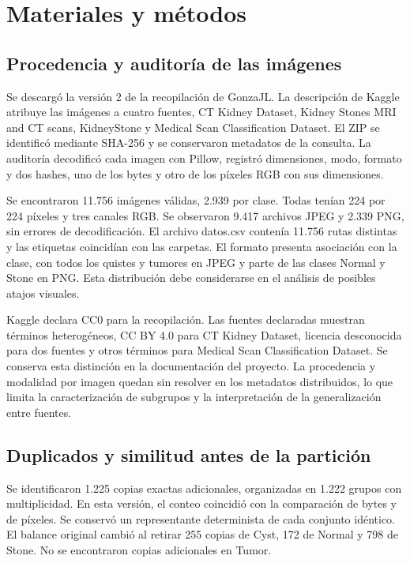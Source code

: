 \documentclass[conference]{IEEEtran}
\begin{document}
\section{Materiales y métodos}
\subsection{Procedencia y auditoría de las imágenes}
Se descargó la versión 2 de la recopilación de GonzaJL. La descripción de Kaggle atribuye las imágenes a cuatro fuentes, CT Kidney Dataset, Kidney Stones MRI and CT scans, KidneyStone y Medical Scan Classification Dataset. El ZIP se identificó mediante SHA-256 y se conservaron metadatos de la consulta. La auditoría decodificó cada imagen con Pillow, registró dimensiones, modo, formato y dos hashes, uno de los bytes y otro de los píxeles RGB con sus dimensiones.

Se encontraron 11.756 imágenes válidas, 2.939 por clase. Todas tenían 224 por 224 píxeles y tres canales RGB. Se observaron 9.417 archivos JPEG y 2.339 PNG, sin errores de decodificación. El archivo datos.csv contenía 11.756 rutas distintas y las etiquetas coincidían con las carpetas. El formato presenta asociación con la clase, con todos los quistes y tumores en JPEG y parte de las clases Normal y Stone en PNG. Esta distribución debe considerarse en el análisis de posibles atajos visuales.

Kaggle declara CC0 para la recopilación. Las fuentes declaradas muestran términos heterogéneos, CC BY 4.0 para CT Kidney Dataset, licencia desconocida para dos fuentes y otros términos para Medical Scan Classification Dataset. Se conserva esta distinción en la documentación del proyecto. La procedencia y modalidad por imagen quedan sin resolver en los metadatos distribuidos, lo que limita la caracterización de subgrupos y la interpretación de la generalización entre fuentes.

\subsection{Duplicados y similitud antes de la partición}
Se identificaron 1.225 copias exactas adicionales, organizadas en 1.222 grupos con multiplicidad. En esta versión, el conteo coincidió con la comparación de bytes y de píxeles. Se conservó un representante determinista de cada conjunto idéntico. El balance original cambió al retirar 255 copias de Cyst, 172 de Normal y 798 de Stone. No se encontraron copias adicionales en Tumor.
\end{document}
